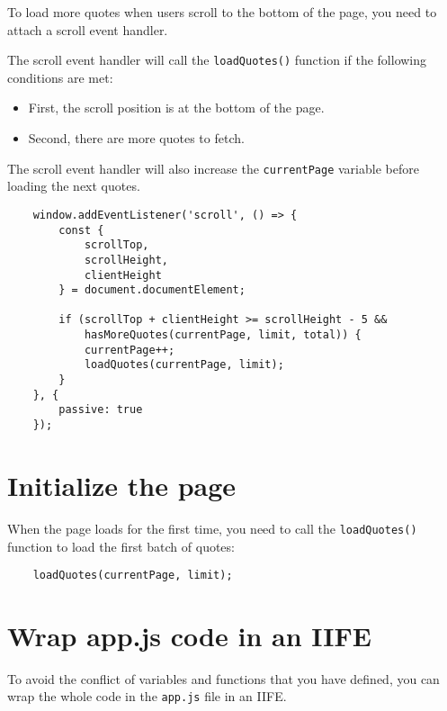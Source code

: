 \documentclass[11pt]{article}
\begin{document}
To load more quotes when users scroll to the bottom of the page,
you need to attach a scroll event handler.
\newline

\noindent
The scroll event handler will call the \verb|loadQuotes()| function
if the following conditions are met:

\begin{itemize}
\item First, the scroll position is at the bottom of the page.
\item Second, there are more quotes to fetch.
\end{itemize}

The scroll event handler will also increase the \verb|currentPage|
variable before loading the next quotes.

\begin{lstlisting}
    window.addEventListener('scroll', () => {
        const {
            scrollTop,
            scrollHeight,
            clientHeight
        } = document.documentElement;

        if (scrollTop + clientHeight >= scrollHeight - 5 &&
            hasMoreQuotes(currentPage, limit, total)) {
            currentPage++;
            loadQuotes(currentPage, limit);
        }
    }, {
        passive: true
    });
\end{lstlisting}

\section*{Initialize the page}

When the page loads for the first time, you need to call the
\verb|loadQuotes()| function to load the first batch of quotes:

\begin{lstlisting}
    loadQuotes(currentPage, limit);
\end{lstlisting}

\section*{Wrap app.js code in an IIFE}

To avoid the conflict of variables and functions that you have defined,
you can wrap the whole code in the \verb|app.js| file in an IIFE.
\newline
\end{document}
